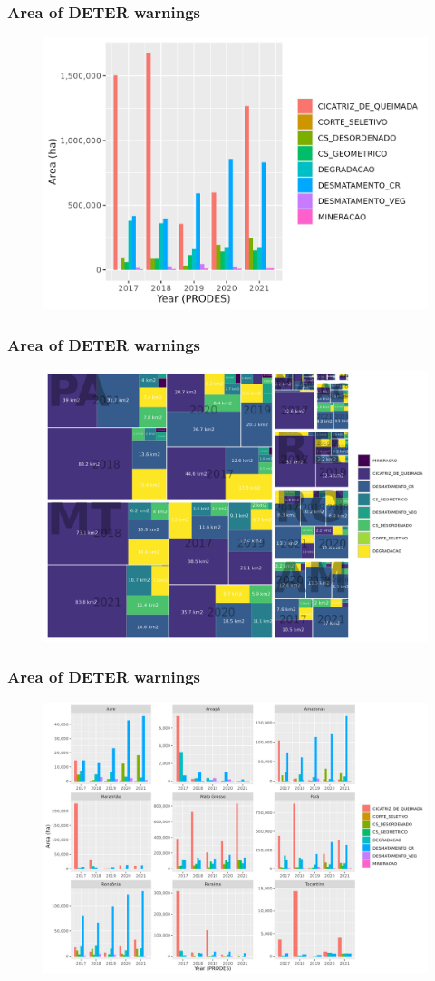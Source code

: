 \documentclass[aspectratio=169]{beamer}
\begin{document}
\begin{frame}
    \frametitle{Area of DETER warnings}
    \begin{figure}[h]
        \includegraphics[width=0.75\linewidth]
        {./figures/plot_deter_area_by_class.png}
    \end{figure}
\end{frame}

\begin{frame}
    \frametitle{Area of DETER warnings}
    \begin{figure}[h] 
        \includegraphics[width=0.75\linewidth]
        {./figures/plot_deter_area_by_state_pyear_type.png}
    \end{figure}
\end{frame}

\begin{frame}
    \frametitle{Area of DETER warnings}
    \begin{figure}[h]
        \includegraphics[width=0.75\linewidth]
        {./figures/plot_deter_area_by_class_state.png}
    \end{figure}
\end{frame}
\end{document}

